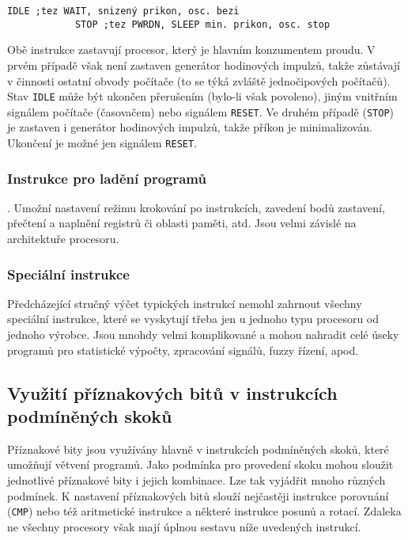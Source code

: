          \begin{lstlisting}[gobble=10]
            IDLE ;tez WAIT, snizený prikon, osc. bezi
            STOP ;tez PWRDN, SLEEP min. prikon, osc. stop
          \end{lstlisting}
          Obě instrukce zastavují procesor, který je hlavním konzumentem proudu. V prvém případě 
          však není zastaven generátor hodinových impulzů, takže zůstávají v činnosti ostatní 
          obvody počítače (to se týká zvláště jednočipových počítačů). Stav \texttt{IDLE} může být 
          ukončen přerušením (bylo-li však povoleno), jiným vnitřním signálem počítače (časovačem) 
          nebo signálem \texttt{RESET}. Ve druhém případě (\texttt{STOP}) je zastaven i generátor 
          hodinových impulzů, takže příkon je minimalizován. Ukončení je možné jen signálem 
          \texttt{RESET}.
          
        \subsubsection{Instrukce pro ladění programů}. 
          Umožní nastavení režimu krokování po instrukcích, zavedení bodů zastavení, přečtení a 
          naplnění registrů či oblasti paměti, atd. Jsou velmi závislé na architektuře procesoru.
          
        \subsubsection{Speciální instrukce} 
          Předcházející stručný výčet typických instrukcí nemohl zahrnout všechny 
          speciální instrukce, které se vyskytují třeba jen u jednoho typu procesoru od jednoho 
          výrobce. Jsou mnohdy velmi komplikované a mohou nahradit celé úseky programů pro 
          statistické výpočty, zpracování signálů, fuzzy řízení, apod.

    \subsection{Využití příznakových bitů v instrukcích podmíněných 
    skoků}\label{ces:IchapIVsecIIssecVII}
      Příznakové bity jsou využívány hlavně v instrukcích podmíněných skoků, které umožňují větvení 
      programů. Jako podmínka pro provedení skoku mohou sloužit jednotlivé příznakové bity i jejich 
      kombinace. Lze tak vyjádřit mnoho různých podmínek. K nastavení příznakových bitů slouží 
      nejčastěji instrukce porovnání (\texttt{CMP}) nebo též aritmetické instrukce a některé 
      instrukce posunů a rotací. Zdaleka ne všechny procesory však mají úplnou sestavu níže 
      uvedených instrukcí.
      
